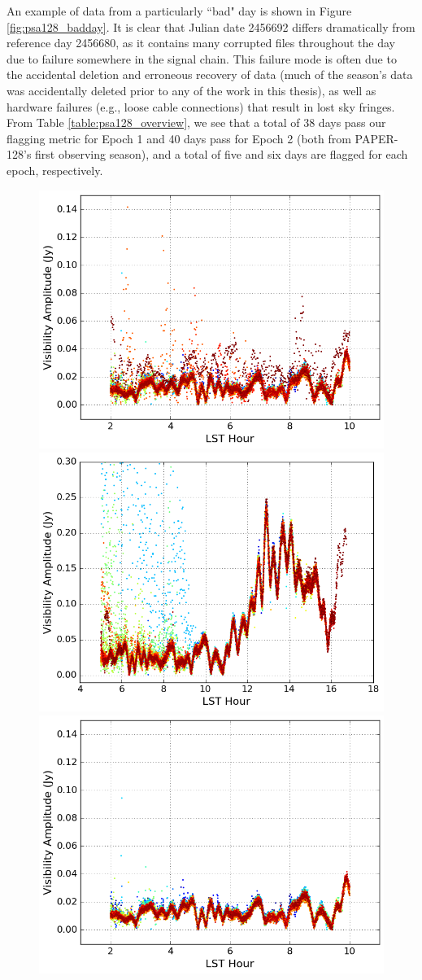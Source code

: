 An example of data from a particularly ``bad" day is shown in Figure \ref{fig:psa128_badday}. It is clear that Julian date 2456692 differs dramatically from reference day 2456680, as it contains many corrupted files throughout the day due to failure somewhere in the signal chain. This failure mode is often due to the accidental deletion and erroneous recovery of data (much of the season's data was accidentally deleted prior to any of the work in this thesis), as well as hardware failures (e.g., loose cable connections) that result in lost sky fringes. From Table \ref{table:psa128_overview}, we see that a total of 38 days pass our flagging metric for Epoch 1 and 40 days pass for Epoch 2 (both from PAPER-128's first observing season), and a total of five and six days are flagged for each epoch, respectively.

\begin{figure}
	\centering
	\includegraphics[trim={0cm 0cm 0cm 0cm},clip,height=0.35\textwidth]{plots/psa128_meanVij_S1E1_before.png}
	\includegraphics[trim={0cm 0cm 0cm 0cm},clip,height=0.35\textwidth]{plots/psa128_meanVij_S1E2_before.png}
	\includegraphics[trim={0cm 0cm 0cm 0cm},clip,height=0.35\textwidth]{plots/psa128_meanVij_S1E1_after.png}

\end{figure}
